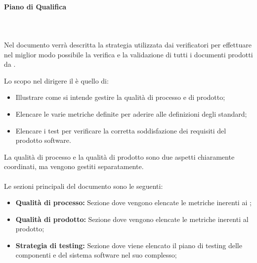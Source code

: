 \paragraph{Piano di Qualifica}\mbox{}
\\\\Nel documento \PdQ{} verrà descritta la strategia utilizzata dai verificatori per effettuare nel miglior modo possibile la verifica e la validazione di tutti i documenti prodotti da \Gruppo{}.

Lo scopo nel dirigere il \PdQ{} è quello di:
\begin{itemize}
	\item Illustrare come si intende gestire la qualità di processo e di prodotto;
	\item Elencare le varie metriche definite per aderire alle definizioni degli standard;
	\item Elencare i test per verificare la corretta soddisfazione dei requisiti del prodotto software.
\end{itemize}

La qualità di processo e la qualità di prodotto sono due aspetti chiaramente coordinati, ma vengono gestiti separatamente. \\ \\
Le sezioni principali del documento sono le seguenti:
\begin{itemize}
    \item \textbf{Qualità di processo:} Sezione dove vengono elencate le metriche inerenti ai ;
    \item \textbf{Qualità di prodotto:} Sezione dove vengono elencate le metriche inerenti al prodotto;
    \item \textbf{Strategia di testing:} Sezione dove viene elencato il piano di testing delle componenti e del sistema software nel suo complesso;
\end{itemize}
